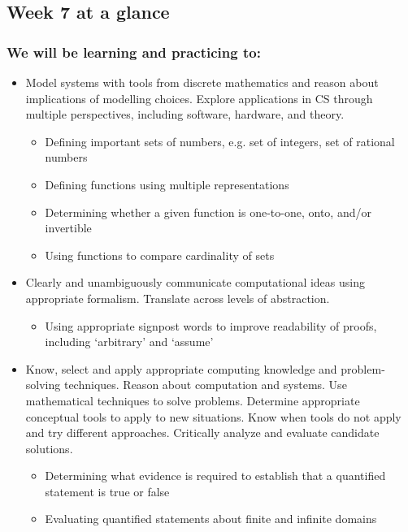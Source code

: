 

\subsection*{Week 7 at a glance}

\subsubsection*{We will be learning and practicing to:}
\begin{itemize}
\item Model systems with tools from discrete mathematics and reason about implications of modelling choices. Explore applications in CS through multiple perspectives, including software, hardware, and theory.
\begin{itemize}
    \item Defining important sets of numbers, e.g. set of integers, set of rational numbers
    \item Defining functions using multiple representations
    \item Determining whether a given function is one-to-one, onto, and/or invertible
    \item Using functions to compare cardinality of sets
\end{itemize}

\item Clearly and unambiguously communicate computational ideas using appropriate formalism. Translate across levels of abstraction.
\begin{itemize}
    \item Using appropriate signpost words to improve readability of proofs, including `arbitrary' and `assume'
\end{itemize}

\item Know, select and apply appropriate computing knowledge and problem-solving techniques. Reason about computation and systems. Use mathematical techniques to solve problems. Determine appropriate conceptual tools to apply to new situations. Know when tools do not apply and try different approaches. Critically analyze and evaluate candidate solutions.
\begin{itemize}
    \item Determining what evidence is required to establish that a quantified statement is true or false
    \item Evaluating quantified statements about finite and infinite domains
\end{itemize}


\end{itemize}
